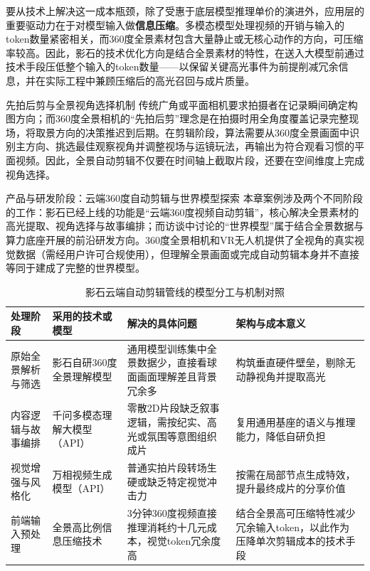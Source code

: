 \documentclass[UTF8,a4paper,11pt,fontset=fandol]{ctexart}
\begin{document}
要从技术上解决这一成本瓶颈，除了受惠于底层模型推理单价的演进外，应用层的重要驱动力在于对模型输入做\textbf{信息压缩}。多模态模型处理视频的开销与输入的token数量紧密相关，而360度全景素材包含大量静止或无核心动作的方向，可压缩率较高。因此，影石的技术优化方向是结合全景素材的特性，在送入大模型前通过技术手段压低整个输入的token数量——以保留关键高光事件为前提削减冗余信息，并在实际工程中兼顾压缩后的高光召回与成片质量。

\begin{knowledgebox}{先拍后剪与全景视角选择机制}
传统广角或平面相机要求拍摄者在记录瞬间确定构图方向；而360度全景相机的“先拍后剪”理念是在拍摄时用全角度覆盖记录完整现场，将取景方向的决策推迟到后期。在剪辑阶段，算法需要从360度全景画面中识别主方向、挑选最佳观察视角并调整视场与运镜玩法，再输出为符合观看习惯的平面视频。因此，全景自动剪辑不仅要在时间轴上截取片段，还要在空间维度上完成视角选择。
\end{knowledgebox}
\begin{warningbox}{产品与研发阶段：云端360度自动剪辑与世界模型探索}
本章案例涉及两个不同阶段的工作：影石已经上线的功能是“云端360度视频自动剪辑”，核心解决全景素材的高光提取、视角选择与故事编排；而访谈中讨论的“世界模型”属于结合全景数据与算力底座开展的前沿研发方向。360度全景相机和VR无人机提供了全视角的真实视觉数据（需经用户许可合规使用），但理解全景画面或完成自动剪辑本身并不直接等同于建成了完整的世界模型。
\end{warningbox}
\begin{table}[H]\centering\small
\caption{影石云端自动剪辑管线的模型分工与机制对照}
\begin{tabular}{>{\raggedright\arraybackslash}p{\dimexpr(\linewidth-8\tabcolsep)/4\relax}>{\raggedright\arraybackslash}p{\dimexpr(\linewidth-8\tabcolsep)/4\relax}>{\raggedright\arraybackslash}p{\dimexpr(\linewidth-8\tabcolsep)/4\relax}>{\raggedright\arraybackslash}p{\dimexpr(\linewidth-8\tabcolsep)/4\relax}}
\toprule
处理阶段 & 采用的技术或模型 & 解决的具体问题 & 架构与成本意义\\\midrule
原始全景解析与筛选 & 影石自研360度全景理解模型 & 通用模型训练集中全景数据少，直接看球面画面理解差且背景冗余多 & 构筑垂直硬件壁垒，剔除无动静视角并提取高光\\[4pt]
内容逻辑与故事编排 & 千问多模态理解大模型（API） & 零散2D片段缺乏叙事逻辑，需按纪实、高光或氛围等意图组织成片 & 复用通用基座的语义与推理能力，降低自研负担\\[4pt]
视觉增强与风格化 & 万相视频生成模型（API） & 普通实拍片段转场生硬或缺乏特定视觉冲击力 & 按需在局部节点生成特效，提升最终成片的分享价值\\[4pt]
前端输入预处理 & 全景高比例信息压缩技术 & 3分钟360度视频直接推理消耗约十几元成本，视觉token冗余度高 & 结合全景高可压缩特性减少冗余输入token，以此作为压降单次剪辑成本的技术手段\\[4pt]
\bottomrule\end{tabular}\end{table}
\end{document}
